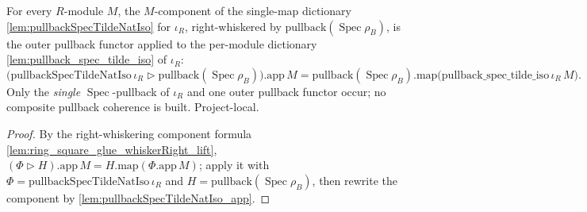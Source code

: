 
\begin{lemma}
  \label{lem:chartBaseChange_geomLeg_iotaR_app}
  For every \(R\)-module \(M\), the \(M\)-component of the single-map dictionary
  \cref{lem:pullbackSpecTildeNatIso} for \(\iota_R\), right-whiskered by
  \(\mathrm{pullback}(\operatorname{Spec}\rho_B)\), is the outer pullback functor applied to the
  per-module dictionary \cref{lem:pullback_spec_tilde_iso} of \(\iota_R\):
  \[
    \bigl(\mathrm{pullbackSpecTildeNatIso}\,\iota_R \rhd
      \mathrm{pullback}(\operatorname{Spec}\rho_B)\bigr).\mathrm{app}\,M
      = \mathrm{pullback}(\operatorname{Spec}\rho_B).\mathrm{map}
        \bigl(\mathrm{pullback\_spec\_tilde\_iso}\,\iota_R\,M\bigr).
  \]
  Only the \emph{single} \(\operatorname{Spec}\)-pullback of \(\iota_R\) and one outer pullback functor
  occur; no composite pullback coherence is built. Project-local.
  \begin{proof}
    By the right-whiskering component formula \cref{lem:ring_square_glue_whiskerRight_lift},
    \((\Phi \rhd H).\mathrm{app}\,M = H.\mathrm{map}(\Phi.\mathrm{app}\,M)\); apply it with
    \(\Phi = \mathrm{pullbackSpecTildeNatIso}\,\iota_R\) and
    \(H = \mathrm{pullback}(\operatorname{Spec}\rho_B)\), then rewrite the component by
    \cref{lem:pullbackSpecTildeNatIso_app}.
  \end{proof}
\end{lemma}

